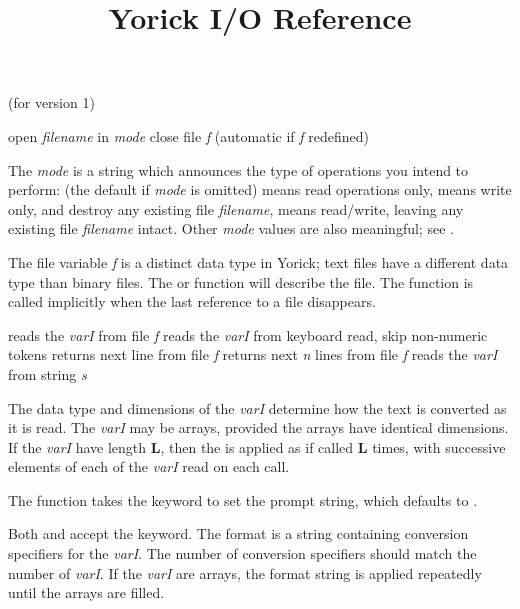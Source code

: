 \par\vfill\supereject


\title{Yorick I/O Reference}

\centerline{(for version 1)}


     {open {\it filename\/} in {\it mode}}
     {close file {\it f} (automatic if {\it f\/} redefined)}

The {\it mode} is a string which announces the type of operations you
intend to perform:  (the default if {\it mode\/} is omitted)
means read operations only,  means write only, and destroy any
existing file {\it filename},  means read/write, leaving any
existing file {\it filename\/} intact.  Other {\it mode\/} values are
also meaningful; see .

The file variable {\it f\/} is a distinct data type in Yorick; text
files have a different data type than binary files.  The 
or  function will describe the file.  The 
function is called implicitly when the last reference to a file disappears.


     {reads the {\it varI} from file {\it f}}
     {reads the {\it varI\/} from keyboard}
     {read, skip non-numeric tokens}
     {returns next line from file {\it f}}
     {returns next {\it n\/} lines from file {\it f}}
     {reads the {\it varI\/} from string {\it s}}

The data type and dimensions of the {\it varI\/} determine how the text
is converted as it is read.  The {\it varI\/} may be arrays, provided the
arrays have identical dimensions.  If the {\it varI\/} have length {\bf L},
then the  is applied as if  called {\bf L} times, with successive
elements of each of the {\it varI\/} read on each call.

The  function takes the  keyword to set the prompt
string, which defaults to .

Both  and  accept the  keyword.  The
format is a string containing conversion specifiers for the {\it varI}.
The number of conversion specifiers should match the number of {\it varI}.
If the {\it varI\/} are arrays, the format string is applied repeatedly
until the arrays are filled.

